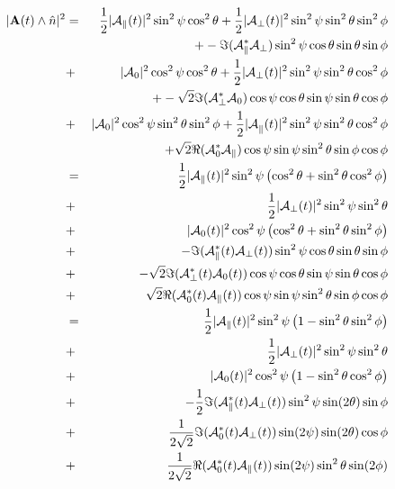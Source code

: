 \documentclass[a4paper,9pt,twoside]{article}
\begin{document}
\begin{eqnarray}
  |{ \bf A}(t) \wedge \hat{n}|^2 &=& 
                                  \frac{1}{2} |{\cal A}_\parallel(t)|^2 \sin^2\psi \cos^2\theta  +  \frac{1 }{2}|{\cal A}_\perp(t)|^2\sin^2\psi\sin^2\theta\sin^2\phi  \\
                              &&+     -\Im({\cal A}_\parallel^*{\cal A}_\perp)\sin^2\psi\cos\theta\sin\theta\sin\phi  \\
                              &+&     |{\cal A}_0|^2 \cos^2\psi\cos^2\theta  + \frac{1}{2} |{\cal A}_\perp(t)|^2\sin^2\psi \sin^2\theta\cos^2\phi \\
                              &&+     -\sqrt{2}\Im({\cal A}_\perp^* {\cal A}_0 )\cos\psi\cos\theta\sin\psi\sin\theta\cos\phi \\
                              &+&     |{\cal A}_0|^2 \cos^2\psi\sin^2\theta\sin^2\phi  + \frac{1}{2}{|\cal A}_\parallel(t)|^2 \sin^2\psi \sin^2\theta\cos^2\phi       \\
                              &&+     \sqrt{2}\Re({\cal A}_0^*{\cal A}_\parallel  )\cos\psi\sin\psi\sin^2\theta\sin\phi\cos\phi\\
                              &=&\frac{1}{2}|{\cal A}_\parallel(t)|^2 \sin^2\psi \left( \cos^2\theta + \sin^2\theta\cos^2\phi    \right)  \\
                              &+&\frac{1}{2}|{\cal A}_\perp(t)|^2\sin^2\psi\sin^2\theta \\
                              &+&   |{\cal A}_0(t)|^2 \cos^2\psi\left( \cos^2\theta  +  \sin^2\theta\sin^2\phi\right) \\
                              &+&     -\Im({\cal A}_\parallel^*(t){\cal A}_\perp(t))\sin^2\psi\cos\theta\sin\theta\sin\phi  \\
                              &+&     -\sqrt{2}\Im({\cal A}_\perp^*(t) {\cal A}_0(t) )\cos\psi\cos\theta\sin\psi\sin\theta\cos\phi \\
                              &+&     \sqrt{2}\Re({\cal A}_0^*(t){\cal A}_\parallel(t)  )\cos\psi\sin\psi\sin^2\theta\sin\phi\cos\phi\\
                              &=&\frac{1}{2}|{\cal A}_\parallel(t)|^2 \sin^2\psi \left( 1 -  \sin^2\theta\sin^2\phi    \right)  \\
                              &+&\frac{1}{2}|{\cal A}_\perp(t)|^2\sin^2\psi\sin^2\theta \\
                              &+&   |{\cal A}_0(t)|^2 \cos^2\psi\left( 1  -  \sin^2\theta\cos^2\phi\right) \\
                              &+&     -\frac{1}{2}\Im({\cal A}_\parallel^*(t){\cal A}_\perp(t))\sin^2\psi\sin(2\theta)\sin\phi  \\
                              &+&     \frac{1}{2\sqrt{2}}\Im({\cal A}_0^*(t) {\cal A}_\perp(t) ) \sin(2\psi)\sin(2\theta)\cos\phi \\
                              &+&     \frac{1}{2\sqrt{2}}\Re({\cal A}_0^*(t) {\cal A}_\parallel(t))\sin(2\psi)\sin^2\theta\sin(2\phi)
\end{eqnarray}
\end{document}
